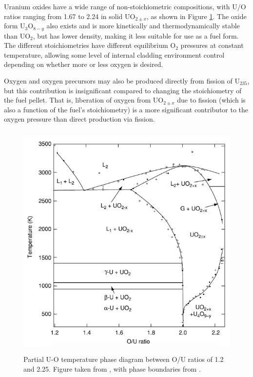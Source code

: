 Uranium oxides have a wide range of non-stoichiometric compositions, with U/O ratios ranging from 1.67 to 2.24 in solid UO$_{2 \pm x}$, as shown in Figure \ref{figure:U_O_phase_diagram}. The oxide form U$_{3}$O$_{8-y}$ also exists and is more kinetically and thermodynamically stable than UO$_{2}$, but has lower density, making it less suitable for use as a fuel form. The different stoichiometries have different equilibrium O$_{2}$ pressures at constant temperature, allowing some level of internal cladding environment control depending on whether more or less oxygen is desired. 

Oxygen and oxygen precursors may also be produced directly from fission of U$_{235}$, but this contribution is insignificant compared to changing the stoichiometry of the fuel pellet. That is, liberation of oxygen from UO$_{2 \pm x}$ due to fission (which is also a function of the fuel's stoichiometry) is a more significant contributor to the oxygen pressure than direct production via fission.

\begin{figure}[ht!]
\centering
\includegraphics[height=12cm]{images/UO_phase_diagram.png}
\caption[Partial U-O temperature phase diagram between O/U ratios of 1.2 and 2.25.]{Partial U-O temperature phase diagram between O/U ratios of 1.2 and 2.25. Figure taken from \cite{katz2007chemistry}, with phase boundaries from \cite{rand1978thermodynamic, chevalier2002progress, gueneau2002thermodynamic}.}
\label{figure:U_O_phase_diagram}
\end{figure}


